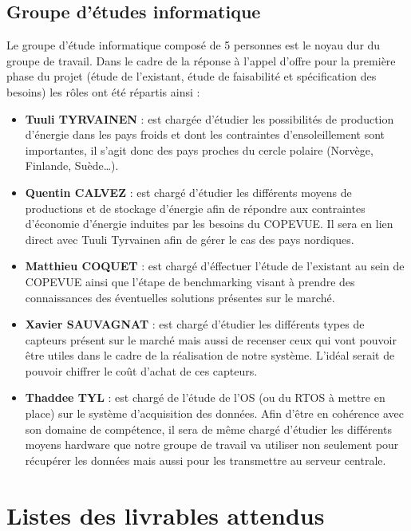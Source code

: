     \subsection{Groupe d'études informatique}

Le groupe d'étude informatique composé de 5 personnes est le noyau dur du groupe de travail. Dans le cadre de la réponse à l'appel d'offre pour la première phase du projet (étude de l'existant, étude de faisabilité et spécification des besoins) les rôles ont été répartis ainsi  :

\begin{itemize}
\item \textbf{Tuuli TYRVAINEN} : est chargée d'étudier les possibilités de production d'énergie dans les pays froids et dont les contraintes d'ensoleillement sont importantes, il s'agit donc des pays proches du cercle polaire (Norvège, Finlande, Suède…).
\item \textbf{Quentin CALVEZ} : est chargé d'étudier les différents moyens de productions et de stockage d'énergie afin de répondre aux contraintes d'économie d'énergie induites par les besoins du COPEVUE. Il sera en lien direct avec Tuuli Tyrvainen afin de gérer le cas des pays nordiques.
\item \textbf{Matthieu COQUET} : est chargé d'éffectuer l'étude de l'existant au sein de COPEVUE ainsi que l'étape de benchmarking visant à prendre des connaissances des éventuelles solutions présentes sur le marché.
\item \textbf{Xavier SAUVAGNAT} : est chargé d'étudier les différents types de capteurs présent sur le marché mais aussi de recenser ceux qui vont pouvoir être utiles dans le cadre de la réalisation de notre système. L'idéal serait de pouvoir chiffrer le coût d'achat de ces capteurs. 
\item \textbf{Thaddee TYL} : est chargé de l'étude de l'OS (ou du RTOS à mettre en place) sur le système d'acquisition des données. Afin d'être en cohérence avec son domaine de compétence, il sera de même chargé d'étudier les différents moyens hardware que notre groupe de travail va utiliser non seulement pour récupérer les données mais aussi pour les transmettre au serveur centrale. 
\end{itemize}

    
    \section{Listes des livrables attendus}


